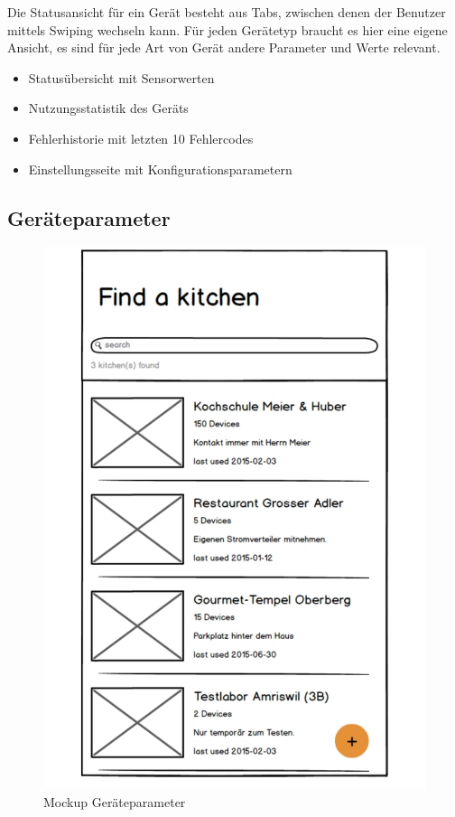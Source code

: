 Die Statusansicht für ein Gerät besteht aus Tabs, zwischen denen der Benutzer mittels Swiping wechseln kann. Für jeden Gerätetyp braucht es hier eine eigene Ansicht, es sind für jede Art von Gerät andere Parameter und Werte relevant.

\begin{itemize}
  \item Statusübersicht mit Sensorwerten
  \item Nutzungsstatistik des Geräts
  \item Fehlerhistorie mit letzten 10 Fehlercodes
  \item Einstellungsseite mit Konfigurationsparametern
\end{itemize}

\vspace{6cm}
\WFclear

\subsection{Geräteparameter}
\label{subsec:Geräteparameter}

\begin{figure}
	\begin{center}
		\includegraphics[page=6,trim=0 0 0 0,clip,scale=0.21]{uiux/res/mockups}
		\caption{Mockup Geräteparameter}
		\label{abb:mockDeviceParams}
	\end{center}
\end{figure}

